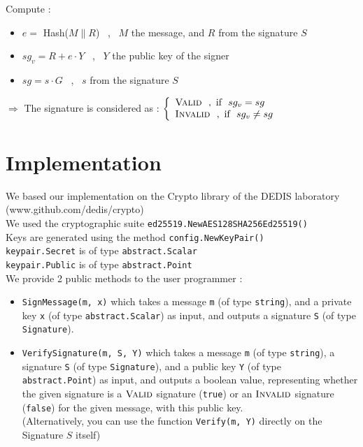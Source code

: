 \documentclass{article}
\begin{document}
Compute : \

\begin{itemize}

  \item $e =$ Hash($M \| R$) \ , \ $M$ the message, and $R$ from the signature $S$

  \item $sg_v = R + e \cdot Y$ \ , \ $Y$ the public key of the signer

  \item $sg = s \cdot G$ \ , \ $s$ from the signature $S$

\end{itemize}

$\Rightarrow$ The signature is considered as :
	$
    \left\{
        \begin{array}{ll}
        	\textsc{Valid} \ \ , \  \text{if } \ sg_v = sg \\
        	\textsc{Invalid} \ \ , \  \text{if } \ sg_v \neq sg
        \end{array}
    \right.
  $



\section{Implementation}

We based our implementation on the Crypto library of the DEDIS laboratory (www.github.com/dedis/crypto) \\

\noindent
We used the cryptographic suite \verb|ed25519.NewAES128SHA256Ed25519()| \\

\noindent
Keys are generated using the method \verb|config.NewKeyPair()| \\
\verb|keypair.Secret| is of type \verb|abstract.Scalar| \\
\verb|keypair.Public| is of type \verb|abstract.Point| \\


We provide 2 public methods to the user programmer :

\begin{itemize}

    \item \verb|SignMessage(m, x)|
    which takes a message \verb|m| (of type \verb|string|), and a private key \verb|x| (of type \verb|abstract.Scalar|) as input, and outputs a signature \verb|S| (of type \verb|Signature|).

    \item \verb|VerifySignature(m, S, Y)|
    which takes a message \verb|m| (of type \verb|string|), a signature \verb|S| (of type \verb|Signature|), and a public key \verb|Y| (of type \verb|abstract.Point|) as input, and outputs a boolean value, representing whether the given signature is a $\textsc{Valid}$ signature (\verb|true|) or an $\textsc{Invalid}$ signature (\verb|false|) for the given message, with this public key. \\
    (Alternatively, you can use the function \verb|Verify(m, Y)| directly on the Signature $S$ itself)

\end{itemize}
\end{document}
